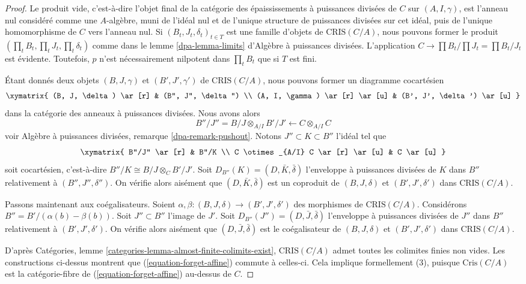 \begin{proof}
Le produit vide, c'est-à-dire l'objet final de la catégorie des épaississements à
puissances divisées de $C$ sur $(A, I, \gamma)$, est l'anneau nul considéré
comme une $A$-algèbre, muni de l'idéal nul et de l'unique structure de puissances divisées
sur cet idéal, puis de l'unique homomorphisme de $C$ vers
l'anneau nul. Si $(B_t, J_t, \delta_t)_{t \in T}$ est une famille d'objets de
$\text{CRIS}(C/A)$, nous pouvons former le produit
$(\prod_t B_t, \prod_t J_t, \prod_t \delta_t)$ comme dans le
lemme \ref{dpa-lemma-limits} d'Algèbre à puissances divisées.
L'application $C \to \prod B_t/\prod J_t = \prod B_t/J_t$ est évidente.
Toutefois, $p$ n'est nécessairement nilpotent dans $\prod_t B_t$
que si $T$ est fini.

\medskip\noindent
Étant donnés deux objets $(B, J, \gamma)$ et $(B', J', \gamma')$ de
$\text{CRIS}(C/A)$, nous pouvons former un diagramme cocartésien
$$
\xymatrix{
(B, J, \delta) \ar[r] & (B'', J'', \delta'') \\
(A, I, \gamma) \ar[r] \ar[u] & (B', J', \delta') \ar[u]
}
$$
dans la catégorie des anneaux à puissances divisées. Nous avons alors
$$
B''/J'' = B/J \otimes_{A/I} B'/J' \longleftarrow C \otimes_{A/I} C
$$
voir Algèbre à puissances divisées, remarque \ref{dpa-remark-pushout}.
Notons $J'' \subset K \subset B''$
l'idéal tel que
$$
\xymatrix{
B''/J'' \ar[r] & B''/K \\
C \otimes_{A/I} C \ar[r] \ar[u] & C \ar[u]
}
$$
soit cocartésien, c'est-à-dire $B''/K \cong B/J \otimes_C B'/J'$.
Soit $D_{B''}(K) = (D, \bar K, \bar \delta)$
l'enveloppe à puissances divisées de $K$ dans $B''$ relativement à
$(B'', J'', \delta'')$. On vérifie alors aisément que
$(D, \bar K, \bar \delta)$ est un coproduit de $(B, J, \delta)$ et
$(B', J', \delta')$ dans $\text{CRIS}(C/A)$.

\medskip\noindent
Passons maintenant aux coégalisateurs. Soient
$\alpha, \beta : (B, J, \delta) \to (B', J', \delta')$ des morphismes de
$\text{CRIS}(C/A)$. Considérons $B'' = B'/ (\alpha(b) - \beta(b))$. Soit
$J'' \subset B''$ l'image de $J'$. Soit
$D_{B''}(J'') = (D, \bar J, \bar\delta)$ l'enveloppe à puissances divisées de
$J''$ dans $B''$ relativement à $(B', J', \delta')$. On vérifie alors aisément
que $(D, \bar J, \bar \delta)$ est le coégalisateur de $(B, J, \delta)$ et
$(B', J', \delta')$ dans $\text{CRIS}(C/A)$.

\medskip\noindent
D'après Catégories, lemme \ref{categories-lemma-almost-finite-colimits-exist},
$\text{CRIS}(C/A)$ admet toutes les colimites finies non vides. Les constructions
ci-dessus montrent que (\ref{equation-forget-affine}) commute à celles-ci.
Cela implique formellement (3), puisque $\text{Cris}(C/A)$ est la catégorie-fibre
de (\ref{equation-forget-affine}) au-dessus de $C$.
\end{proof}

